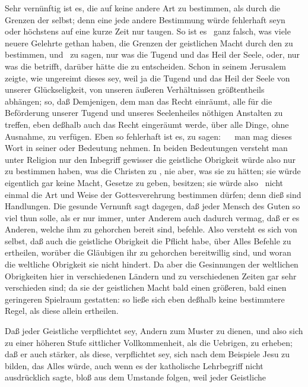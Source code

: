\begin{aufza}
\begin{aufzb}
\begin{aufzc}
\end{aufzc}
\end{aufzb}
\item Sehr vernünftig ist es, die  auf keine andere Art zu bestimmen, als durch die Grenzen der  selbst; denn eine jede andere Bestimmung würde fehlerhaft seyn oder höchstens auf eine kurze Zeit nur taugen. So ist es \zB\  ganz falsch, was viele neuere Gelehrte gethan haben, die Grenzen der geistlichen Macht durch den  zu bestimmen, und \zB\  zu sagen, nur was die Tugend und das Heil der Seele, oder, nur was die  betrifft, darüber hätte die  zu entscheiden. Schon  in seinem Jerusalem zeigte, wie ungereimt dieses sey, weil ja die Tugend und das Heil der Seele von unserer  Glückseligkeit, von unseren äußeren Verhältnissen größtentheils abhängen; so, daß Demjenigen, dem man das Recht einräumt, alle für die Beförderung unserer Tugend und unseres Seelenheiles nöthigen Anstalten zu treffen, eben deßhalb auch das Recht eingeräumt werde, über alle Dinge, ohne Ausnahme, zu verfügen. Eben so fehlerhaft ist es, zu sagen: ~\  man mag dieses Wort in seiner  oder  Bedeutung nehmen. In beiden Bedeutungen versteht man unter Religion nur den Inbegriff gewisser  die geistliche Obrigkeit würde also nur zu bestimmen haben, was die Christen zu , nie aber, was sie zu  hätten; sie würde eigentlich gar keine Macht, Gesetze zu geben, besitzen; sie würde also \zB\ nicht einmal die Art und Weise der Gottesverehrung bestimmen dürfen; denn dieß sind Handlungen. Die gesunde Vernunft sagt dagegen, daß jeder Mensch des Guten so viel thun solle, als er nur immer, unter Anderem auch dadurch vermag, daß er es Anderen, welche ihm zu gehorchen bereit sind, befehle. Also versteht es sich von selbst, daß auch die geistliche Obrigkeit die Pflicht habe, über Alles Befehle zu ertheilen, worüber die Gläubigen ihr zu gehorchen bereitwillig sind, und woran die weltliche Obrigkeit sie nicht hindert. Da aber die Gesinnungen der weltlichen Obrigkeiten hier in verschiedenen Ländern und zu verschiedenen Zeiten gar sehr verschieden sind; da sie der geistlichen Macht bald einen größeren, bald einen geringeren Spielraum gestatten: so ließe sich eben deßhalb keine bestimmtere Regel, als diese allein ertheilen.
\item Daß jeder Geistliche verpflichtet sey, Andern zum Muster zu dienen, und also sich zu einer höheren Stufe sittlicher Vollkommenheit, als die Uebrigen, zu erheben; daß er auch stärker, als diese, verpflichtet sey, sich nach dem Beispiele Jesu zu bilden, das Alles würde, auch wenn es der katholische Lehrbegriff nicht ausdrücklich sagte, bloß aus dem Umstande folgen, weil jeder Geistliche

\end{aufza}
